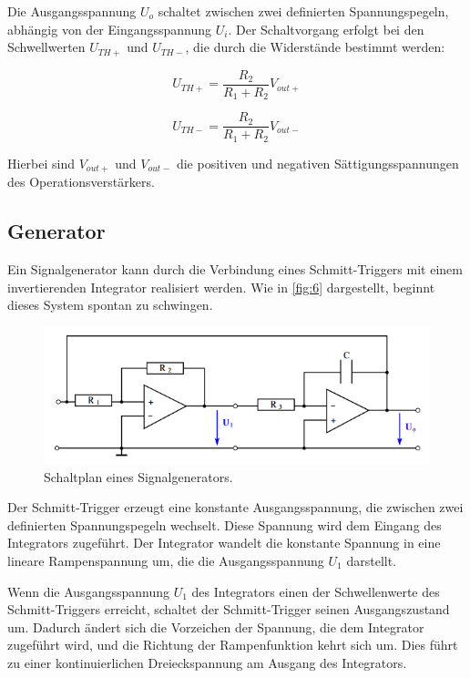 \documentclass[12pt]{article}
\begin{document}
Die Ausgangsspannung \( U_o \) schaltet zwischen zwei definierten Spannungspegeln, abhängig von der Eingangsspannung \( U_i \). Der Schaltvorgang erfolgt bei den Schwellwerten \( U_{TH+} \) und \( U_{TH-} \), die durch die Widerstände bestimmt werden:

\begin{equation}
    U_{TH+} = \frac{R_2}{R_1 + R_2} V_{out+}\label{eqn:schwell}
\end{equation}

\begin{equation}
    U_{TH-} = \frac{R_2}{R_1 + R_2} V_{out-}
\end{equation}

Hierbei sind \( V_{out+} \) und \( V_{out-} \) die positiven und negativen Sättigungsspannungen des Operationsverstärkers.
\subsection{Generator}
Ein Signalgenerator kann durch die Verbindung eines Schmitt-Triggers mit einem invertierenden Integrator realisiert werden. Wie in \autoref{fig:6} dargestellt, beginnt dieses System spontan zu schwingen.
\begin{figure}[H]
  \centering
  \includegraphics[scale=0.8]{Ressourcen/generator.png}
  \caption{Schaltplan eines Signalgenerators\cite{anleitung}.}\label{fig:6}
\end{figure}
Der Schmitt-Trigger erzeugt eine konstante Ausgangsspannung, die zwischen zwei definierten Spannungspegeln wechselt. Diese Spannung wird dem Eingang des Integrators zugeführt. Der Integrator wandelt die konstante Spannung in eine lineare Rampenspannung um, die die Ausgangsspannung \( U_1 \) darstellt. 

Wenn die Ausgangsspannung \( U_1 \) des Integrators einen der Schwellenwerte des Schmitt-Triggers erreicht, schaltet der Schmitt-Trigger seinen Ausgangszustand um. Dadurch ändert sich die Vorzeichen der Spannung, die dem Integrator zugeführt wird, und die Richtung der Rampenfunktion kehrt sich um. Dies führt zu einer kontinuierlichen Dreieckspannung am Ausgang des Integrators.
\end{document}
